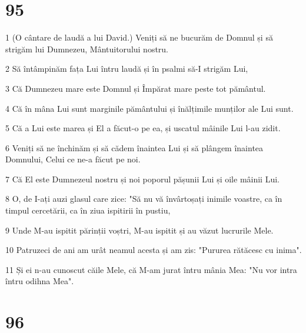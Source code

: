 \chapter{95}

\par 1 (O cântare de laudă a lui David.) Veniți să ne bucurăm de Domnul și să strigăm lui Dumnezeu, Mântuitorului nostru.
\par 2 Să întâmpinăm fața Lui întru laudă și în psalmi să-I strigăm Lui,
\par 3 Că Dumnezeu mare este Domnul și Împărat mare peste tot pământul.
\par 4 Că în mâna Lui sunt marginile pământului și înălțimile munților ale Lui sunt.
\par 5 Că a Lui este marea și El a făcut-o pe ea, și uscatul mâinile Lui l-au zidit.
\par 6 Veniți să ne închinăm și să cădem înaintea Lui și să plângem înaintea Domnului, Celui ce ne-a făcut pe noi.
\par 7 Că El este Dumnezeul nostru și noi poporul pășunii Lui și oile mâinii Lui.
\par 8 O, de I-ați auzi glasul care zice: "Să nu vă învârtoșați inimile voastre, ca în timpul cercetării, ca în ziua ispitirii în pustiu,
\par 9 Unde M-au ispitit părinții voștri, M-au ispitit și au văzut lucrurile Mele.
\par 10 Patruzeci de ani am urât neamul acesta și am zis: "Pururea rătăcesc cu inima".
\par 11 Și ei n-au cunoscut căile Mele, că M-am jurat întru mânia Mea: "Nu vor intra întru odihna Mea".

\chapter{96}

